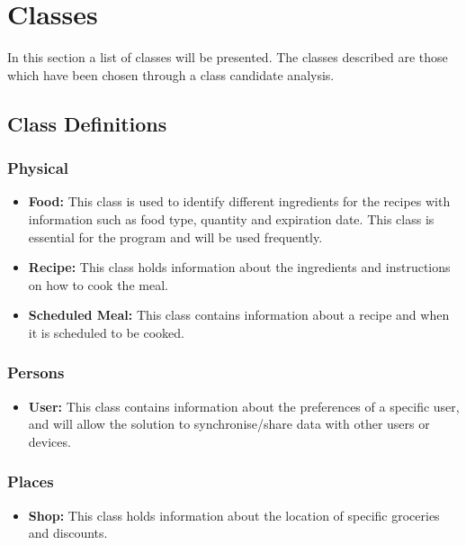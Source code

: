 \section{Classes}\label{ClassesLabel}
In this section a list of classes will be presented. The classes described are those which have been chosen through a class candidate analysis.

\subsection{Class Definitions}

\subsubsection{Physical}
\begin{itemize}
\item \textbf{Food:} This class is used to identify different ingredients for the recipes with information such as food type, quantity and expiration date. This class is essential for the program and will be used frequently.
\item \textbf{Recipe:} This class holds information about the ingredients and instructions on how to cook the meal.
\item \textbf{Scheduled Meal:} This class contains information about a recipe and when it is scheduled to be cooked.
\end{itemize}

\subsubsection{Persons}
\begin{itemize}
\item \textbf{User:} This class contains information about the preferences of a specific user, and will allow the solution to synchronise/share data with other users or devices.
\end{itemize}

\subsubsection{Places}
\begin{itemize}
\item \textbf{Shop:} This class holds information about the location of specific groceries and discounts.
\end{itemize}

